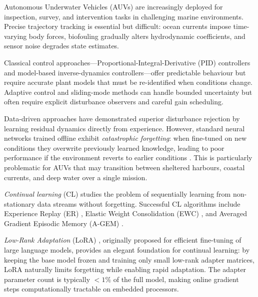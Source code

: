 \documentclass[journal]{IEEEtran}
\begin{document}
Autonomous Underwater Vehicles (AUVs) are increasingly deployed for
inspection, survey, and intervention tasks in challenging marine environments.
Precise trajectory tracking is essential but difficult: ocean currents impose
time-varying body forces, biofouling gradually alters hydrodynamic
coefficients, and sensor noise degrades state estimates.

Classical control approaches—Proportional-Integral-Derivative (PID)
controllers and model-based inverse-dynamics controllers—offer predictable
behaviour but require accurate plant models that must be re-identified when
conditions change. Adaptive control and sliding-mode methods can handle
bounded uncertainty but often require explicit disturbance observers and
careful gain scheduling.

Data-driven approaches have demonstrated superior disturbance rejection by
learning residual dynamics directly from experience. However, standard neural
networks trained offline exhibit \emph{catastrophic forgetting}: when
fine-tuned on new conditions they overwrite previously learned knowledge,
leading to poor performance if the environment reverts to earlier conditions
\cite{mccloskey1989catastrophic}. This is particularly problematic for AUVs
that may transition between sheltered harbours, coastal currents, and deep
water over a single mission.

\emph{Continual learning} (CL) studies the problem of sequentially learning
from non-stationary data streams without forgetting. Successful CL
algorithms include Experience Replay (ER) \cite{rolnick2019experience},
Elastic Weight Consolidation (EWC) \cite{kirkpatrick2017overcoming}, and
Averaged Gradient Episodic Memory (A-GEM) \cite{chaudhry2019efficient}.

\emph{Low-Rank Adaptation} (LoRA) \cite{hu2022lora}, originally proposed for
efficient fine-tuning of large language models, provides an elegant foundation
for continual learning: by keeping the base model frozen and training only
small low-rank adapter matrices, LoRA naturally limits forgetting while
enabling rapid adaptation. The adapter parameter count is typically
$< 1\%$ of the full model, making online gradient steps computationally
tractable on embedded processors.
\end{document}
